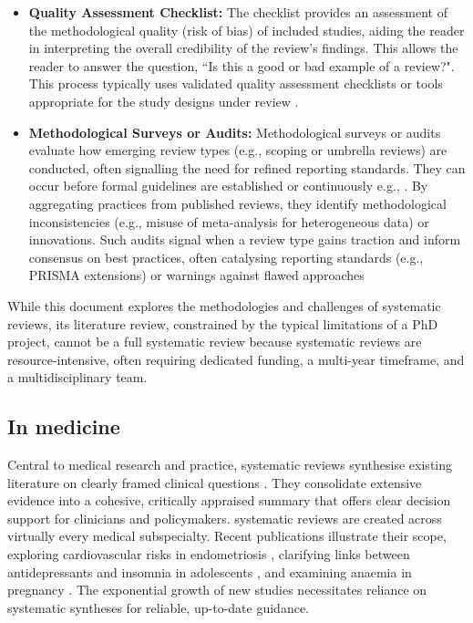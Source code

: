 \documentclass{article}
\begin{document}
\begin{itemize}
    \item {\bf{Quality Assessment Checklist:}} The checklist provides an assessment of the methodological quality (risk of bias) of included studies, aiding the reader in interpreting the overall credibility of the review's findings. This allows the reader to answer the question, ``Is this a good or bad example of a review?". This process typically uses validated quality assessment checklists or tools appropriate for the study designs under review \cite{whiting_proposed_2017}.
    \item {\bf{Methodological Surveys or Audits:}} Methodological surveys or audits evaluate how emerging review types (e.g., scoping or umbrella reviews) are conducted, often signalling the need for refined reporting standards. They can occur before formal guidelines are established or continuously e.g., \cite{dalton_potential_2017, france_methodological_2014}. By aggregating practices from published reviews, they identify methodological inconsistencies (e.g., misuse of meta-analysis for heterogeneous data) or innovations. Such audits signal when a review type gains traction and inform consensus on best practices, often catalysing reporting standards (e.g., PRISMA extensions) or warnings against flawed approaches \cite{tricco_prisma_2018, sarkis-onofre_how_2021,rethlefsen_prisma-s_2021, rethlefsen_prisma-s_2021-1}
\end{itemize}

While this document explores the methodologies and challenges of systematic reviews, its literature review, constrained by the typical limitations of a PhD project, cannot be a full systematic review because systematic reviews are resource-intensive, often requiring dedicated funding, a multi-year timeframe, and a multidisciplinary team.
\subsection{In medicine}

Central to medical research and practice, systematic reviews synthesise existing literature on clearly framed clinical questions \cite{kranke_evidence-based_2010, higgins_cochrane_2019}. They consolidate extensive evidence into a cohesive, critically appraised summary that offers clear decision support for clinicians and policymakers. systematic reviews are created across virtually every medical subspecialty. Recent publications illustrate their scope, exploring cardiovascular risks in endometriosis \cite{parsa_endometriosis_2025}, clarifying links between antidepressants and insomnia in adolescents \cite{turkmen_systematic_2025}, and examining anaemia in pregnancy \cite{azzam_anemia_2025}. The exponential growth of new studies necessitates reliance on systematic syntheses for reliable, up-to-date guidance.
\end{document}
